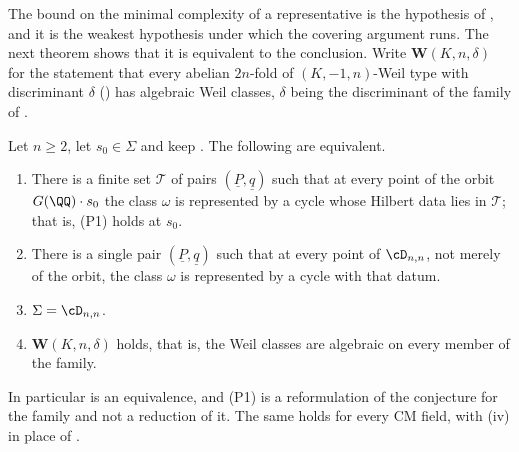 The bound on the minimal complexity of a representative is the hypothesis of
, and it is the weakest hypothesis under which the
covering argument runs. The next theorem shows that it is equivalent to the
conclusion. Write $\mathbf{W}(K,n,\delta)$ for the statement that every
abelian $2n$-fold of $(K,-1,n)$-Weil type with discriminant $\delta$
() has algebraic Weil classes, $\delta$ being the discriminant
of the family of .

\begin{theorem}\label{thm:p1equivalent}
Let $n\ge2$, let $s_{0}\in\Sigma$ and keep . The following
are equivalent.
\begin{enumerate}[label=\textup{(\alph*)},leftmargin=2.6em,itemsep=2pt]
\item There is a finite set $\mathcal{T}$ of pairs
  $(\underline{P},\underline{q})$ such that at every point of the orbit
  $G(\QQ)\cdot s_{0}$ the class $\omega$ is represented by a cycle whose
  Hilbert data lies in $\mathcal{T}$; that is, \textup{(P1)} holds at
  $s_{0}$.
\item There is a single pair $(\underline{P},\underline{q})$ such that at
  every point of $\cD_{n,n}$, not merely of the orbit, the class $\omega$ is
  represented by a cycle with that datum.
\item $\Sigma=\cD_{n,n}$.
\item $\mathbf{W}(K,n,\delta)$ holds, that is, the Weil classes are algebraic
  on every member of the family.
\end{enumerate}
In particular  is an equivalence, and \textup{(P1)} is a
reformulation of the conjecture for the family and not a reduction of it. The
same holds for every CM field, with (iv) in place of
.
\end{theorem}

